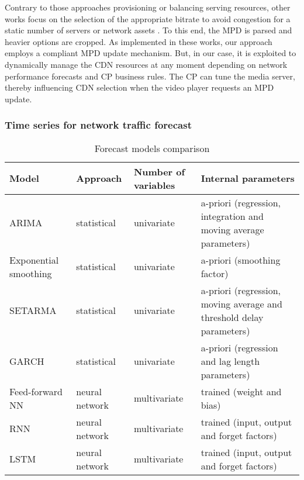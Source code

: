 Contrary to those approaches provisioning or balancing serving resources, other works focus on the selection of the appropriate bitrate to avoid congestion for a static number of servers \cite{sadi2020} or network assets \cite{giannone2020}. To this end, the MPD is parsed and heavier options are cropped. As implemented in these works, our approach employs a compliant MPD update mechanism. But, in our case, it is exploited to dynamically manage the CDN resources at any moment depending on network performance forecasts and CP business rules. The CP can tune the media server, thereby influencing CDN selection when the video player requests an MPD update.

\subsubsection{Time series for network traffic forecast}
\label{sec:timeseries}

\begin{table}[t]
	\caption{Forecast models comparison}
	\centering
	\label{tab:IEEETBC2020models}
	\def\arraystretch{1.2}%
	\setlength\tabcolsep{2.0pt} %
	{\scriptsize
	\begin{tabular}{>{\centering\arraybackslash}m{}
			>{\centering\arraybackslash}m{}
			>{\centering\arraybackslash}m{}
			>{\centering\arraybackslash}m{}
		}
		\toprule
		\textbf{Model} & \textbf{Approach} & \textbf{Number of variables} & \textbf{Internal parameters}\\
		\midrule
		\midrule
		ARIMA & statistical & univariate & a-priori (regression, integration and moving average parameters)\\
		Exponential smoothing & statistical & univariate & a-priori (smoothing factor)\\
		SETARMA & statistical & univariate & a-priori (regression, moving average and threshold delay parameters)\\
		GARCH & statistical & univariate & a-priori (regression and lag length parameters)\\
		Feed-forward NN & neural network & multivariate & trained (weight and bias)\\
		RNN & neural network & multivariate & trained (input, output and forget factors)\\
		LSTM & neural network & multivariate & trained (input, output and forget factors)\\
		\bottomrule
		\bottomrule
	\end{tabular}
	}
\end{table}

